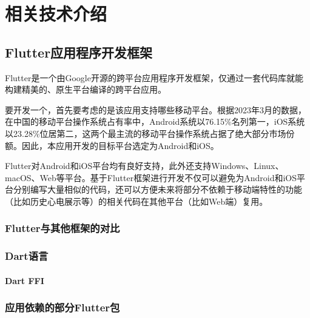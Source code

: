 

\chapter{相关技术介绍}\label{ch:tech}


\section{Flutter应用程序开发框架}\label{sec:flutter}

Flutter是一个由Google开源的跨平台应用程序开发框架，仅通过一套代码库就能构建精美的、原生平台编译的跨平台应用\cite{FlutterBuildApps}。

要开发一个\app ，首先要考虑的是该应用支持哪些移动平台。根据2023年3月的数据\cite{MobileOperatingSystem}，在中国的移动平台操作系统占有率中，Android系统以76.15\%名列第一，iOS系统以23.28\%位居第二，这两个最主流的移动平台操作系统占据了绝大部分市场份额。因此，本应用开发的目标平台选定为Android和iOS。

Flutter对Android和iOS平台均有良好支持，此外还支持Windows、Linux、macOS、Web等平台\cite{SupportedDeploymentPlatforms}。基于Flutter框架进行开发不仅可以避免为Android和iOS平台分别编写大量相似的代码，还可以方便未来将部分不依赖于移动端特性的功能（比如历史心电展示等）的相关代码在其他平台（比如Web端）复用。

\subsection{Flutter与其他框架的对比}\label{subsec:flutter-compare}


\subsection{Dart语言}\label{subsec:dart}



\subsubsection{Dart FFI}\label{subsubsec:ffi}


\subsection{应用依赖的部分Flutter包}\label{subsec:flutter-packages}

